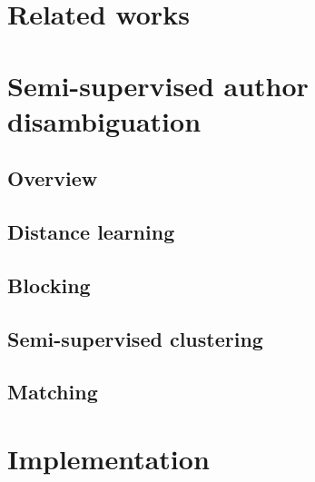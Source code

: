 \documentclass{article}
\begin{document}

\section{Related works}
\label{relate-works}



\section{Semi-supervised author disambiguation}
\label{methods}

\subsection{Overview}

\subsection{Distance learning}

\subsection{Blocking}

\subsection{Semi-supervised clustering}

\subsection{Matching}



\section{Implementation}
\label{implementation}
\end{document}
